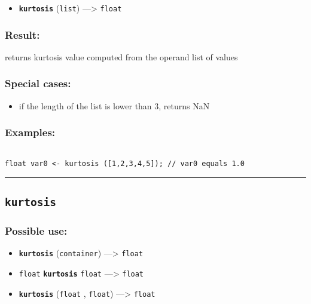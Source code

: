 \documentclass[]{book}
\providecommand{\tightlist}{%
  \setlength{\itemsep}{0pt}\setlength{\parskip}{0pt}}
\theoremstyle{definition}
\theoremstyle{definition}
\theoremstyle{definition}
\theoremstyle{remark}
\begin{document}
\begin{itemize}
\tightlist
\item
  \textbf{\texttt{kurtosis}} (\texttt{list}) ---\textgreater{}
  \texttt{float}
\end{itemize}

\subsubsection{Result:}\label{result-304}

returns kurtosis value computed from the operand list of values

\subsubsection{Special cases:}\label{special-cases-83}

\begin{itemize}
\tightlist
\item
  if the length of the list is lower than 3, returns NaN
\end{itemize}

\subsubsection{Examples:}\label{examples-221}

\begin{verbatim}
 
float var0 <- kurtosis ([1,2,3,4,5]); // var0 equals 1.0
\end{verbatim}

\begin{center}\rule{0.5\linewidth}{\linethickness}\end{center}

\subsection{\texorpdfstring{\texttt{kurtosis}}{kurtosis}}\label{kurtosis-1}

\subsubsection{Possible use:}\label{possible-use-315}

\begin{itemize}
\tightlist
\item
  \textbf{\texttt{kurtosis}} (\texttt{container}) ---\textgreater{}
  \texttt{float}
\item
  \texttt{float} \textbf{\texttt{kurtosis}} \texttt{float}
  ---\textgreater{} \texttt{float}
\item
  \textbf{\texttt{kurtosis}} (\texttt{float} , \texttt{float})
  ---\textgreater{} \texttt{float}
\end{itemize}
\end{document}
